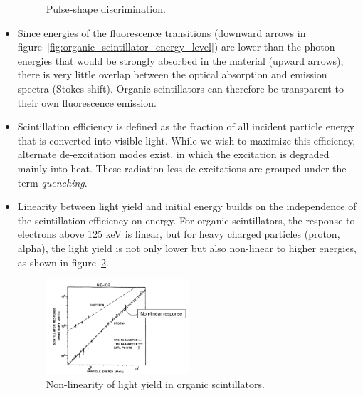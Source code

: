 \begin{itemize}
\begin{figure}[ht]
        \caption{Pulse-shape discrimination.}
        \label{fig:organic_scintillator_psd}
    \end{figure}
    \item Since energies of the fluorescence transitions (downward arrows in figure~\ref{fig:organic_scintillator_energy_level}) are lower than the photon energies that would be strongly absorbed in the material (upward arrows), there is very little overlap between the optical absorption and emission spectra (Stokes shift). Organic scintillators can therefore be transparent to their own fluorescence emission.
    \item Scintillation efficiency is defined as the fraction of all incident particle energy that is converted into visible light. While we wish to maximize this efficiency, alternate de-excitation modes exist, in which the excitation is degraded mainly into heat. These radiation-less de-excitations are grouped under the term \emph{quenching}.
    \item Linearity between light yield and initial energy builds on the independence of the scintillation efficiency on energy. For organic scintillators, the response to electrons above 125 keV is linear, but for heavy charged particles (proton, alpha), the light yield is not only lower but also non-linear to higher energies, as shown in figure~\ref{fig:organic_scintillator_proton_nonlinear}. 

    \begin{figure}[ht]
        \centering
        \includegraphics[width=0.5\textwidth]{images/organic_scintillator_proton_nonlinear.png}
        \caption{Non-linearity of light yield in organic scintillators.}
        \label{fig:organic_scintillator_proton_nonlinear}
    \end{figure}
\end{itemize}

